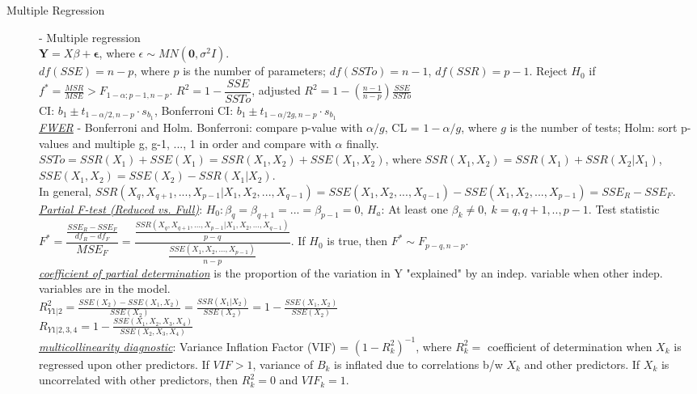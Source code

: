 \documentclass[10pt,landscape]{article}
\begin{document}
\begin{multicols}{3}
    \begin{description}
    		\item[Multiple Regression] - Multiple regression \\ %
    		$\boldsymbol{Y} = X\beta+\boldsymbol{\epsilon}$, where $\epsilon \sim MN(\boldsymbol{0}, \sigma^2I)$. \\    	
    		$df(SSE) = n-p$, where $p$ is the number of parameters; $df(SSTo) = n-1$, $df(SSR) = p-1$.  Reject $H_0$ if $f^* =  \frac{MSR}{MSE} > F_{1-\alpha; p-1, n-p}$. $R^2 = 1-\dfrac{SSE}{SSTo}$, adjusted $R^2 = 1 - (\frac{n-1}{n-p}) \frac{SSE}{SSTo}$\\
    		CI: $b_1 \pm t_{1-\alpha/2, n-p} \cdot s_{b_1}$, Bonferroni CI:  $b_1 \pm t_{1-\alpha/2g, n-p} \cdot s_{b_1}$\\	
		\underline{\textit{FWER}} - Bonferroni and Holm. Bonferroni: compare p-value with $\alpha / g$, CL = $1-\alpha / g$, where $g$ is the number of tests; Holm: sort p-values and multiple g, g-1, ..., 1 in order and compare with $\alpha$ finally. \\
		$SSTo = SSR(X_1) + SSE(X_1) = SSR(X_1, X_2) + SSE(X_1, X_2)$, where $SSR(X_1, X_2) = SSR(X_1) + SSR(X_2|X_1)$, $SSE(X_1,  X_2) = SSE(X_2) - SSR(X_1|X_2)$.\\
		In general,  $SSR(X_q, X_{q+1},..., X_{p-1}|X_1, X_2,...,X_{q-1}) = SSE(X_1, X_2,...,X_{q-1}) - SSE(X_1, X_2, ...,X_{p-1}) = SSE_R - SSE_F$.\\
		\underline{\textit{Partial F-test (Reduced vs. Full)}}: $H_0: \beta_q = \beta_{q+1} = ... = \beta_{p-1} = 0$, $H_a$: At least one $\beta_k \neq 0,\ k = q, q+1, .., p-1$. Test statistic $F^* = \dfrac{\frac{SSE_R - SSE_F}{df_R - df_F}}{MSE_F} = \dfrac{\frac{SSR(X_q, X_{q+1}, ..., X_{p-1} | X_1, X_2, ..., X_{q-1})}{p-q}}{\frac{SSE(X_1, X_2, ..., X_{p-1})}{n-p}} $. If $H_0$ is true, then $F^* \sim F_{p-q, n-p}$.\\
		\underline{\textit{coefficient of partial determination}} is the proportion of the variation in Y "explained" by an indep. variable when other indep. variables are in the model. \\
		$R_{Y1|2}^2 = \frac{SSE(X_2) - SSE(X_1, X_2)}{SSE(X_2)} = \frac{SSR(X_1|X_2)}{SSE(X_2)} = 1 - \frac{SSE(X_1, X_2)}{SSE(X_2)}$ \\
		$R_{Y1|2,3,4} = 1 - \frac{SSE(X_1, X_2, X_3, X_4)}{SSE(X_2, X_3, X_4)}$\\
		\underline{\textit{multicollinearity diagnostic}}: Variance Inflation Factor (VIF) = $(1 - R_k^2)^{-1}$, where $R_k^2=$ coefficient of determination when $X_k$ is regressed upon other predictors. If $VIF>1$, variance of $B_k$ is inflated due to correlations b/w $X_k$ and other predictors. 	If $X_k$ is uncorrelated with other predictors, then $R_k^2 = 0$ and $VIF_k = 1$. \\ 
		

\end{description}
\end{multicols}
\end{document}
